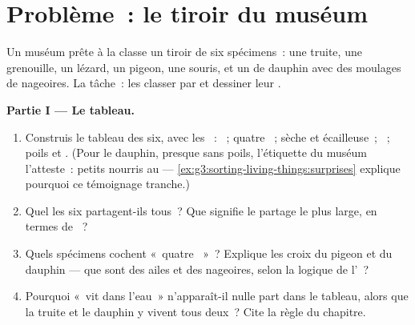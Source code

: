 \section{Problème~: le tiroir du muséum}

\begin{problem}\label{pb:g6:classification-kinship:1}
Un muséum prête à la classe un tiroir de six spécimens~: une truite,
une grenouille, un lézard, un pigeon, une souris, et un  de
dauphin avec des moulages de nageoires. La tâche~: les classer par
 et dessiner leur .

\medskip\noindent\textbf{Partie I --- Le tableau.}
\begin{enumerate}
  \item Construis le tableau des six, avec les ~: ~; quatre ~;  sèche et écailleuse~;
        ~; poils et . (Pour le dauphin, presque sans
        poils, l'étiquette du muséum l'atteste~: petits nourris au
         --- \cref{ex:g3:sorting-living-things:surprises}
        explique pourquoi ce témoignage tranche.)
  \item Quel  les six partagent-ils tous~? Que signifie le
        partage le plus large, en termes de ~?
  \item Quels spécimens cochent «~quatre ~»~? Explique les
        croix du pigeon et du dauphin --- que sont des ailes et des
        nageoires, selon la logique de l'~?
  \item Pourquoi «~vit dans l'eau~» n'apparaît-il nulle part dans
        le tableau, alors que la truite et le dauphin y vivent tous
        deux~? Cite la règle du chapitre.
\end{enumerate}


\end{problem}
